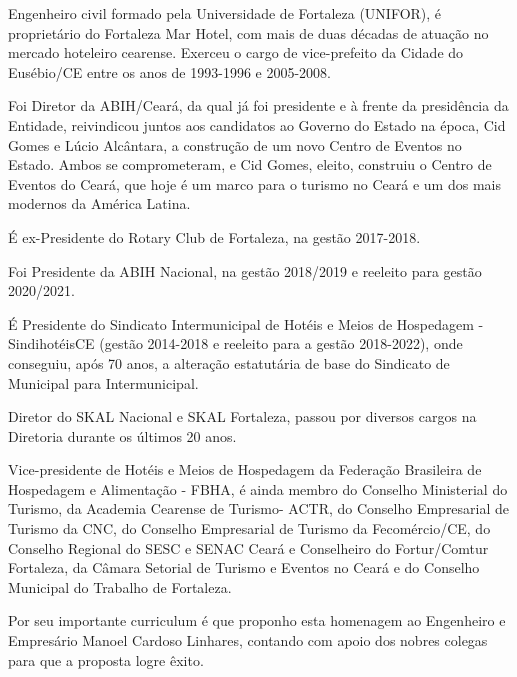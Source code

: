 \documentclass[10pt]{article}
\begin{document}
	Engenheiro civil formado pela Universidade de Fortaleza (UNIFOR), é proprietário do Fortaleza Mar Hotel, com mais de duas décadas de atuação no mercado hoteleiro cearense.
Exerceu o cargo de vice-prefeito da Cidade do Eusébio/CE entre os anos de 1993-1996 e 2005-2008.

	Foi Diretor da ABIH/Ceará, da qual já foi presidente e à frente da presidência da Entidade, reivindicou juntos aos candidatos ao Governo do Estado na época, Cid Gomes e Lúcio Alcântara, a construção de um novo Centro de Eventos no Estado. Ambos se comprometeram, e Cid Gomes, eleito, construiu o Centro de Eventos do Ceará, que hoje é um marco para o turismo no Ceará e um dos mais modernos da América Latina.

	É ex-Presidente do Rotary Club de Fortaleza, na gestão 2017-2018.

	Foi Presidente da ABIH Nacional, na gestão 2018/2019 e reeleito para gestão 2020/2021.

	É Presidente do Sindicato Intermunicipal de Hotéis e Meios de Hospedagem - SindihotéisCE (gestão 2014-2018 e reeleito para a gestão 2018-2022), onde conseguiu, após 70 anos, a alteração estatutária de base do Sindicato de Municipal para Intermunicipal.

	Diretor do SKAL Nacional e SKAL Fortaleza, passou por diversos cargos na Diretoria durante os últimos 20 anos.

	Vice-presidente de Hotéis e Meios de Hospedagem da Federação Brasileira de Hospedagem e Alimentação - FBHA, é ainda membro do Conselho Ministerial do Turismo, da Academia Cearense de Turismo- ACTR,  do Conselho Empresarial de Turismo da CNC, do Conselho Empresarial de Turismo da Fecomércio/CE, do Conselho Regional do SESC e SENAC Ceará e Conselheiro do Fortur/Comtur Fortaleza, da Câmara Setorial de Turismo e Eventos no Ceará e do Conselho Municipal do Trabalho de Fortaleza.

	Por seu importante curriculum é que proponho esta homenagem ao Engenheiro e Empresário Manoel Cardoso Linhares, contando com apoio dos nobres colegas para que a proposta logre êxito.



\iffalse
\begin{center}
  \textbf{REFERÊNCIAS}
\end{center}


\fi
\end{document}
